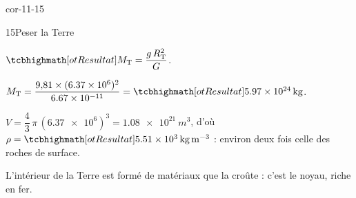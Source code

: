\begin{blocLivre}{cor-11-15}
\begin{corrige}{15}{Peser la Terre}
\begin{questions}
\item $\res{M_\mathrm{T}=\dfrac{g\,R_\mathrm{T}^2}{G}}$.
\item $M_\mathrm{T}=\dfrac{9{,}81\times(\num{6,37e6})^2}{\num{6,67e-11}}=\res{\qty{5,97e24}{kg}}$.
\item $V=\dfrac{4}{3}\,\pi\,(\num{6,37e6})^3=\qty{1,08e21}{m^3}$, d'où $\rho=\res{\qty{5,51e3}{kg.m^{-3}}}$ : environ deux fois celle des roches de surface.
\item L'intérieur de la Terre est formé de matériaux  que la croûte : c'est le noyau, riche en fer.
\end{questions}
\end{corrige}
\end{blocLivre}
